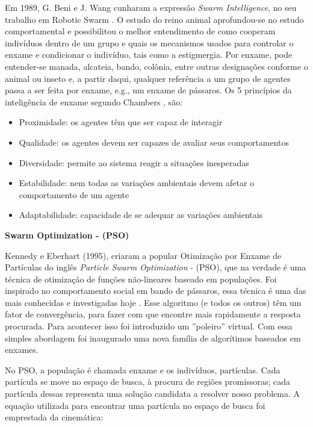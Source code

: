 \documentclass[conference,compsoc]{IEEEtran}
\begin{document}
Em 1989, G. Beni e J. Wang cunharam a expressão \textit{Swarm Intelligence}, no seu
trabalho em Robotic Swarm \cite{SRobotics}. O estudo do reino animal aprofundou-se no estudo
comportamental e possibilitou o melhor entendimento de como cooperam indivíduos dentro de um grupo e
quais os mecanismos usados para controlar o enxame e condicionar o indivíduo, tais como a estigmergia. 
Por enxame, pode entender-se manada, alcateia, bando, colônia, entre outras designações conforme o animal 
ou inseto e, a partir daqui, qualquer referência a um grupo de agentes passa a ser feita por enxame, e.g., 
um enxame de pássaros. Os 5 princípios da inteligência de enxame segundo  Chambers \cite{chambers2014computer}, são:
\begin{itemize}
	\item{Proximidade: os agentes têm que ser capaz de interagir}
	\item{Qualidade: os agentes devem ser capazes de avaliar seus comportamentos}
	\item{Diversidade: permite ao sistema reagir a situações inesperadas}
	\item{Estabilidade: nem todas as variações ambientais devem afetar o comportamento de um agente}
	\item{Adaptabilidade: capacidade de se adequar as variações ambientais}
\end{itemize}

\quad
\flushleft \textbf{Swarm Optimization - (PSO)}
\vspace{0.1cm}

Kennedy e Eberhart (1995), criaram a popular Otimização por Enxame de Partículas do inglês \textit{Particle Swarm Optimization} - (PSO), 
que na verdade é uma técnica de otimização de funções não-lineares baseado em populações. Foi inspirado no comportamento
social em bando de pássaros, essa técnica é uma das mais conhecidas e investigadas hoje \cite{Kennedy1995}.
Esse algoritmo (e todos os outros) têm um fator de convergência, para fazer com que encontre mais rapidamente a resposta procurada.
Para acontecer isso foi introduzido um ''poleiro'' virtual. Com essa simples abordagem foi inaugurado uma nova
família de algorítimos baseados em enxames. 

No PSO, a população é chamada enxame e os indivíduos, partículas. Cada partícula se move no espaço de busca, 
à procura de regiões promissoras; cada partícula dessas representa uma solução candidata a resolver nosso problema.
A equação utilizada para encontrar uma partícula no espaço de busca foi emprestada da cinemática:
\end{document}
